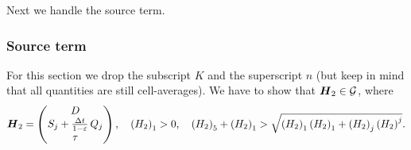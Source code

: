Next we handle the source term.

\subsubsection{Source term}
For this section we drop the subscript $K$ and the superscript $n$ (but keep in mind that all quantities are still cell-averages). We have to show that $\boldsymbol{H}_{2}\in\mathcal{G}$, where
\begin{equation}
    \boldsymbol{H}_{2}=\begin{pmatrix}D\\ S_{j}+\frac{\Delta t}{1-\varepsilon}\,Q_{j} \\ \tau\end{pmatrix},\hspace{1em}\left(H_{2}\right)_{1}>0,\hspace{1em}\left(H_{2}\right)_{5}+\left(H_{2}\right)_{1}>\sqrt{\left(H_{2}\right)_{1}\left(H_{2}\right)_{1}+\left(H_{2}\right)_{j}\left(H_{2}\right)^{j}}.
\end{equation}

